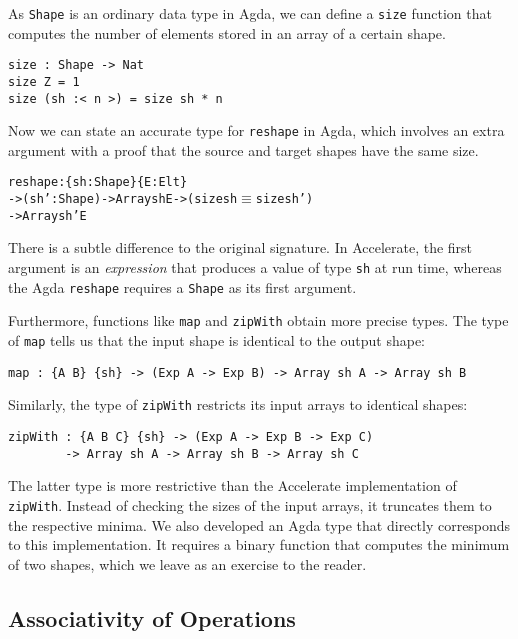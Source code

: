 \documentclass{llncs}
\begin{document}
As \texttt{Shape} is an ordinary data type in Agda, we can define a
\texttt{size} function that computes the number of elements stored in
an array of a certain shape.
\begin{verbatim}
size : Shape -> Nat
size Z = 1
size (sh :< n >) = size sh * n
\end{verbatim}
Now we can state an accurate type for \texttt{reshape} in Agda, which
involves an extra argument with a proof that the source and
target shapes have the same size.
\begin{alltt}
reshape : \{sh : Shape\} \{E : Elt\}
       -> (sh' : Shape) -> Array sh E -> (size sh \(\equiv\) size sh')
       -> Array sh' E
\end{alltt}
There is a subtle difference to the original signature. In
Accelerate, the first argument is an \emph{expression} that produces a
value of type \texttt{sh} at run time, whereas the Agda
\texttt{reshape} requires a \texttt{Shape} as its first argument.


Furthermore, functions like \texttt{map} and \texttt{zipWith} obtain
more precise types. The type of \texttt{map} tells us that the input
shape is identical to the output shape:
\begin{verbatim}
map : {A B} {sh} -> (Exp A -> Exp B) -> Array sh A -> Array sh B
\end{verbatim}
Similarly, the type of \texttt{zipWith} restricts its input arrays to
identical shapes:
\begin{verbatim}
zipWith : {A B C} {sh} -> (Exp A -> Exp B -> Exp C)
        -> Array sh A -> Array sh B -> Array sh C
\end{verbatim}
The latter type is more restrictive than the Accelerate implementation
of \texttt{zipWith}. Instead of checking the sizes of the input
arrays, it truncates them to the respective minima. We also developed
an Agda type that directly corresponds to this implementation. It
requires a binary function that computes the minimum of two shapes,
which we leave as an exercise to the reader.

\subsection{Associativity of Operations}
\label{sec:assoc-oper}
\end{document}
